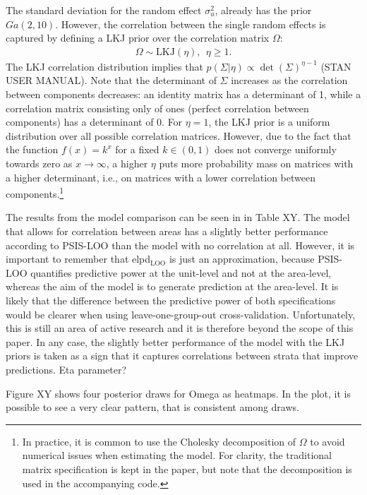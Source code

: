 The standard deviation for the random effect $\sigma_u^2$, already has the prior $Ga(2, 10)$.
However, the correlation between the single random effects is captured by defining a LKJ prior over the correlation matrix $\Omega$:
\begin{gather*}
    \Omega \sim \text{LKJ}(\eta), ~~ \eta \ge 1.
\end{gather*}
The LKJ correlation distribution implies that $p(\Sigma|\eta) \propto \det(\Sigma)^{\eta - 1}$ (STAN USER MANUAL).
Note that the determinant of $\Sigma$ increases as the correlation between components decreases:
an identity matrix has a determinant of 1, while a correlation matrix consisting only of ones (perfect correlation between components) has a determinant of 0.
For $\eta = 1$, the LKJ prior is a uniform distribution over all possible correlation matrices.
However, due to the fact that the function $f(x) = k^x$ for a fixed $k \in (0, 1)$ does not converge uniformly towards zero as $x \rightarrow \infty$, a higher $\eta$ puts more probability mass on matrices with a higher determinant, i.e., on matrices with a lower correlation between components.\footnote{In practice, it is common to use the Cholesky decomposition of $\Omega$ to avoid numerical issues when estimating the model.
For clarity, the traditional matrix specification is kept in the paper, but note that the decomposition is used in the accompanying code.}

The results from the model comparison can be seen in in Table XY.
The model that allows for correlation between areas has a slightly better performance according to PSIS-LOO than the model with no correlation at all.
However, it is important to remember that elpd$_{\text{LOO}}$ is just an approximation, because PSIS-LOO quantifies predictive power at the unit-level and not at the area-level, whereas the aim of the model is to generate prediction at the area-level.
It is likely that the difference between the predictive power of both specifications would be clearer when using leave-one-group-out cross-validation.
Unfortunately, this is still an area of active research and it is therefore beyond the scope of this paper.
In any case, the slightly better performance of the model with the LKJ priors is taken as a sign that it captures correlations between strata that improve predictions.
Eta parameter?

Figure XY shows four posterior draws for Omega as heatmaps. In the plot, it is possible to see a very clear pattern, that is consistent among draws.


